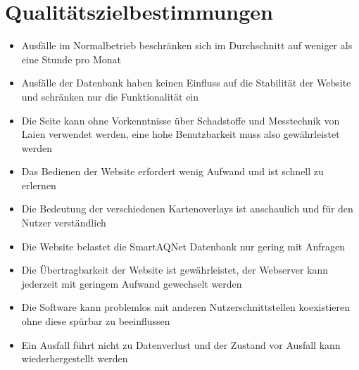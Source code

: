 \section{Qualitätszielbestimmungen}
\begin{itemize}
    \item Ausfälle im Normalbetrieb beschränken sich im Durchschnitt auf weniger als eine Stunde pro Monat
    \item Ausfälle der Datenbank haben keinen Einfluss auf die Stabilität der Website und schränken nur die Funktionalität ein
    \item Die Seite kann ohne Vorkenntnisse über Schadstoffe und Messtechnik von Laien verwendet werden, eine hohe Benutzbarkeit muss also gewährleistet werden
    \item Das Bedienen der Website erfordert wenig Aufwand und ist schnell zu erlernen
    \item Die Bedeutung der verschiedenen Kartenoverlays ist anschaulich und für den Nutzer verständlich
    \item Die Website belastet die SmartAQNet Datenbank nur gering mit Anfragen
    \item Die Übertragbarkeit der Website ist gewährleistet, der Webserver kann jederzeit mit geringem Aufwand gewechselt werden
    \item Die Software kann problemlos mit anderen Nutzerschnittstellen koexistieren ohne diese spürbar zu beeinflussen
    \item Ein Ausfall führt nicht zu Datenverlust und der Zustand vor Ausfall kann wiederhergestellt werden
\end{itemize}